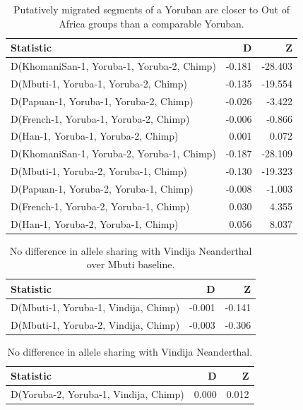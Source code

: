 \begin{table}[ht]
  \centering
  \begin{tabular}{lrr}
    \hline
  Statistic & D & Z \\ 
    \hline
  D(KhomaniSan-1, Yoruba-1, Yoruba-2, Chimp) & -0.181 & -28.403 \\ 
    D(Mbuti-1, Yoruba-1, Yoruba-2, Chimp) & -0.135 & -19.554 \\ 
    D(Papuan-1, Yoruba-1, Yoruba-2, Chimp) & -0.026 & -3.422 \\ 
    D(French-1, Yoruba-1, Yoruba-2, Chimp) & -0.006 & -0.866 \\ 
    D(Han-1, Yoruba-1, Yoruba-2, Chimp) & 0.001 & 0.072 \\ 
    D(KhomaniSan-1, Yoruba-2, Yoruba-1, Chimp) & -0.187 & -28.109 \\ 
    D(Mbuti-1, Yoruba-2, Yoruba-1, Chimp) & -0.130 & -19.323 \\ 
    D(Papuan-1, Yoruba-2, Yoruba-1, Chimp) & -0.008 & -1.003 \\ 
    D(French-1, Yoruba-2, Yoruba-1, Chimp) & 0.030 & 4.355 \\ 
    D(Han-1, Yoruba-2, Yoruba-1, Chimp) & 0.056 & 8.037 \\ 
     \hline
  \end{tabular}
  \caption{Putatively migrated segments of a Yoruban are closer to Out of Africa groups than a comparable Yoruban.} 
  \label{dstats:a1}
  \end{table}
  
  \begin{table}[ht]
  \centering
  \begin{tabular}{lrr}
    \hline
  Statistic & D & Z \\ 
    \hline
  D(Mbuti-1, Yoruba-1, Vindija, Chimp) & -0.001 & -0.141 \\ 
    D(Mbuti-1, Yoruba-2, Vindija, Chimp) & -0.003 & -0.306 \\ 
     \hline
  \end{tabular}
  \caption{No difference in allele sharing with Vindija Neanderthal over Mbuti baseline.} 
  \label{dstats:a5}
  \end{table}
  
  \begin{table}[ht]
  \centering
  \begin{tabular}{lrr}
    \hline
  Statistic & D & Z \\ 
    \hline
  D(Yoruba-2, Yoruba-1, Vindija, Chimp) & 0.000 & 0.012 \\ 
     \hline
  \end{tabular}
  \caption{No difference in allele sharing with Vindija Neanderthal.} 
  \label{dstats:a4}
  \end{table}
  
